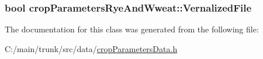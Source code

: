 \label{classcrop_parameters_rye_and_wweat_acfe10c34164be015d900c88aaa4a1376}
\hypertarget{classcrop_parameters_rye_and_wweat_a5d7852cb8973d94d11c286c25b0a43fa}{
\subsubsection[{VernalizedFile}]{\setlength{\rightskip}{0pt plus 5cm}bool {\bf cropParametersRyeAndWweat::VernalizedFile}}}
\label{classcrop_parameters_rye_and_wweat_a5d7852cb8973d94d11c286c25b0a43fa}


The documentation for this class was generated from the following file:\begin{DoxyCompactItemize}
\item 
C:/main/trunk/src/data/\hyperlink{crop_parameters_data_8h}{cropParametersData.h}\end{DoxyCompactItemize}
